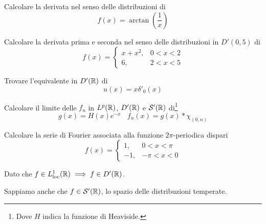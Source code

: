 Calcolare la derivata nel senso delle distribuzioni di
\begin{equation*}
f(x)=\arctan\left(\frac{1}{x}\right)
\end{equation*}
\Esercizio{}

Calcolare la derivata prima e seconda nel senso delle distribuzioni in $D'( 0,5)$ di
\begin{equation*}
f(x)=\begin{cases}
x+x^{2} , & 0< x< 2\\
6, & 2< x< 5
\end{cases}
\end{equation*}
\Esercizio{}

Trovare l'equivalente in $D'(\mathbb{R}  )$ di
\begin{equation*}
u(x)=x\delta '_{0} (x)
\end{equation*}
\Esercizio{}

Calcolare il limite delle $f_{n}$ in $L^{p} (\mathbb{R}  )$, $D'(\mathbb{R}  )$ e $\mathcal{S}  '(\mathbb{R}  )$ di\footnote{Dove $H$ indica la funzione di Heaviside.}
\begin{equation*}
g(x)=H(x)e^{-x} \ \ \ \ f_{n} (x)=g(x)*\chi _{(0,n)}
\end{equation*}
\Esercizio{}

Calcolare la serie di Fourier associata alla funzione $2\pi $-periodica dispari
\begin{equation*}
f(x)=\begin{cases}
1, & 0< x< \pi \\
-1, & -\pi < x< 0
\end{cases}
\end{equation*}
\ParteSoluzioni
\Soluzione

Dato che $f\in L^{1}_{\mathrm{loc}} (\mathbb{R}  )\implies f\in D'(\mathbb{R}  )$.

Sappiamo anche che $f\in \mathcal{S}  '(\mathbb{R} )$, lo spazio delle distribuzioni temperate.


